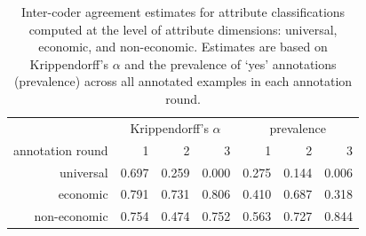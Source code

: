 \begin{table}[!th]
\centering
\caption{Inter-coder agreement estimates for attribute classifications computed at the level of attribute dimensions: universal, economic, and non-economic. Estimates are based on Krippendorff's $\alpha$ and the prevalence of `yes' annotations (prevalence) across all annotated examples in each annotation round.}
\label{tableC01}
\begin{tabular}{rrrrrrr}
\toprule
 & \multicolumn{3}{c}{Krippendorff's $\alpha$} & \multicolumn{3}{c}{prevalence} \\
annotation round & 1 & 2 & 3 & 1 & 2 & 3 \\
\midrule
universal & 0.697 & 0.259 & 0.000 & 0.275 & 0.144 & 0.006 \\
economic & 0.791 & 0.731 & 0.806 & 0.410 & 0.687 & 0.318 \\
non-economic & 0.754 & 0.474 & 0.752 & 0.563 & 0.727 & 0.844 \\
\bottomrule
\end{tabular}
\end{table}
